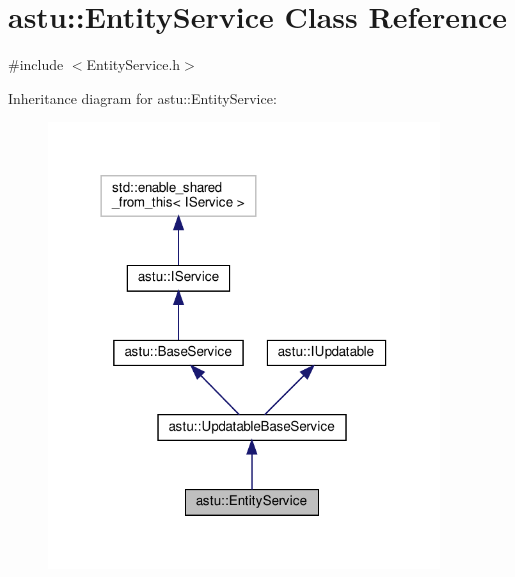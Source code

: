 \hypertarget{classastu_1_1EntityService}{}\section{astu\+:\+:Entity\+Service Class Reference}
\label{classastu_1_1EntityService}


{\ttfamily \#include $<$Entity\+Service.\+h$>$}



Inheritance diagram for astu\+:\+:Entity\+Service\+:\nopagebreak
\begin{figure}[H]
\begin{center}
\leavevmode
\includegraphics[width=294pt]{classastu_1_1EntityService__inherit__graph}
\end{center}
\end{figure}


